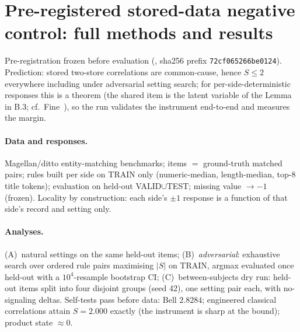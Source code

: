 \documentclass[11pt]{article}
\theoremstyle{definition}
\begin{document}
\section{Pre-registered stored-data negative control: full methods and results}
Pre-registration frozen before evaluation (, sha256 prefix \texttt{72cf065266be0124}). Prediction: stored two-store correlations are common-cause, hence $S\le2$ everywhere including under adversarial setting search; for per-side-deterministic responses this is a theorem (the shared item is the latent variable of the Lemma in B.3; cf.~Fine~\cite{fine1982}), so the run validates the instrument end-to-end and measures the margin.

\paragraph{Data and responses.} Magellan/ditto entity-matching benchmarks; items $=$ ground-truth matched pairs; rules built per side on TRAIN only (numeric-median, length-median, top-8 title tokens); evaluation on held-out VALID$\cup$TEST; missing value $\to-1$ (frozen). Locality by construction: each side's $\pm1$ response is a function of that side's record and setting only.

\paragraph{Analyses.} (A)~natural settings on the same held-out items; (B)~\emph{adversarial}: exhaustive search over ordered rule pairs maximising $\lvert S\rvert$ on TRAIN, argmax evaluated once held-out with a $10^4$-resample bootstrap CI; (C)~between-subjects dry run: held-out items split into four disjoint groups (seed 42), one setting pair each, with no-signaling deltas. Self-tests pass before data: Bell $2.8284$; engineered classical correlations attain $S=2.000$ exactly (the instrument is sharp at the bound); product state $\approx0$.
\end{document}
